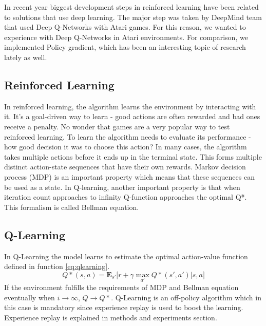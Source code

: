 In recent year biggest development steps in reinforced learning have been related to solutions that use deep learning. The major step was taken by DeepMind team that used Deep Q-Networks with Atari games. For this reason, we wanted to experience with Deep Q-Networks in Atari environments. For comparison, we implemented Policy gradient, which has been an interesting topic of research lately as well.

\subsection{Reinforced Learning}
In reinforced learning, the algorithm learns the environment by interacting with it. It’s a goal-driven way to learn - good actions are often rewarded and bad ones receive a penalty. No wonder that games are a very popular way to test reinforced learning.
To learn the algorithm needs to evaluate its performance - how good decision it was to choose this action? In many cases, the algorithm takes multiple actions before it ends up in the terminal state. This forms multiple distinct action-state sequences that have their own rewards. Markov decision process (MDP) is an important property which means that these sequences can be used as a state. In Q-learning, another important property is that when iteration count approaches to infinity Q-function approaches the optimal Q*. This formalism is called Bellman equation. \cite{mnih2015human}

\subsection{Q-Learning}
In Q-Learning the model learns to estimate the optimal action-value function defined in function \ref{eq:qlearning}.
\begin{equation}
    \label{eq:qlearning}
    Q*(s,a) = \mathbf{E}_{s'} \Big[ r + \gamma \max_{a'} Q*(s',a')|s, a \Big]
\end{equation}
If the environment fulfills the requirements of MDP and Bellman equation eventually when $i \rightarrow \infty$, $Q \rightarrow Q*$.
Q-Learning is an off-policy algorithm which in this case is mandatory since experience replay is used to boost the learning. Experience replay is explained in methods and experiments section. \cite{mnih2015human} \cite{rlintroduction}

